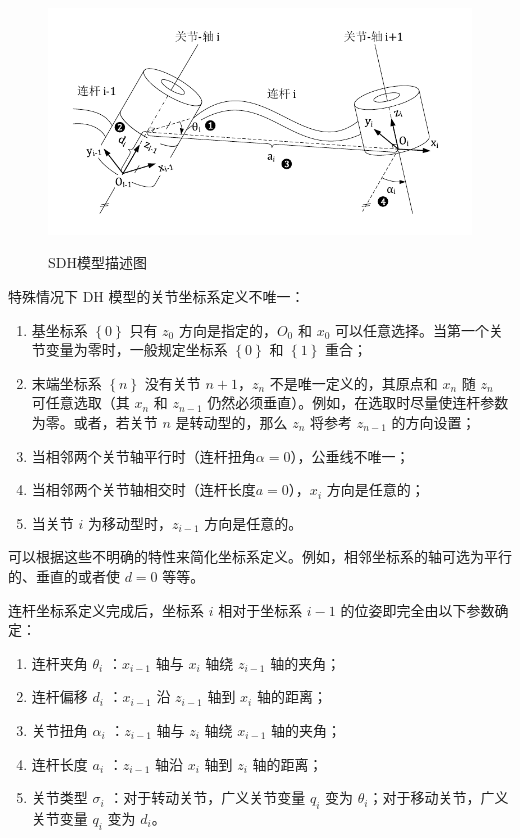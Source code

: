 \documentclass[cn,11pt,chinese,blue,bibstyle=ieeetr]{elegantbook}
\begin{document}
\begin{figure}[htbp]
	\centering
	\includegraphics[scale=1]{images//sdh_model.pdf} \\
	\caption{SDH模型描述图}
	\label{sdh_model_description}
\end{figure}

特殊情况下 DH 模型的关节坐标系定义不唯一：
\begin{enumerate}
\item 基坐标系 $\left\{0\right\}$ 只有 $z_0$ 方向是指定的，$O_0$ 和 $x_0$ 可以任意选择。当第一个关节变量为零时，一般规定坐标系 $\left\{0\right\}$ 和 $\left\{1\right\}$ 重合；
\item 末端坐标系 $\left\{n\right\}$ 没有关节 $n+1$，$z_n$ 不是唯一定义的，其原点和 $x_n$ 随 $z_n$ 可任意选取（其 $x_n$ 和 $z_{n-1}$ 仍然必须垂直）。例如，在选取时尽量使连杆参数为零。或者，若关节 $n$ 是转动型的，那么 $z_n$ 将参考 $z_{n-1}$ 的方向设置；
\item 当相邻两个关节轴平行时（连杆扭角$\alpha=0$），公垂线不唯一；
\item 当相邻两个关节轴相交时（连杆长度$a=0$），$x_i$ 方向是任意的；
\item 当关节 $i$ 为移动型时，$z_{i-1}$ 方向是任意的。
\end{enumerate}
可以根据这些不明确的特性来简化坐标系定义。例如，相邻坐标系的轴可选为平行的、垂直的或者使 $d=0$ 等等。

连杆坐标系定义完成后，坐标系 $i$ 相对于坐标系 $i-1$ 的位姿即完全由以下参数确定：
\begin{enumerate}
\item 连杆夹角 $\theta_{i}$ ：$x_{i-1}$ 轴与 $x_i$ 轴绕 $z_{i-1}$ 轴的夹角；
\item 连杆偏移 $d_{i}$ ：$x_{i-1}$ 沿 $z_{i-1}$ 轴到 $x_i$ 轴的距离；
\item 关节扭角 $\alpha_{i}$ ：$z_{i-1}$ 轴与 $z_i$ 轴绕 $x_{i-1}$ 轴的夹角；
\item 连杆长度 $a_{i}$ ：$z_{i-1}$ 轴沿 $x_i$ 轴到 $z_i$ 轴的距离；
\item 关节类型 $\sigma_i$ ：对于转动关节，广义关节变量 $q_i$ 变为 $\theta_{i}$；对于移动关节，广义关节变量 $q_i$ 变为 $d_i$。
\end{enumerate}
\end{document}
